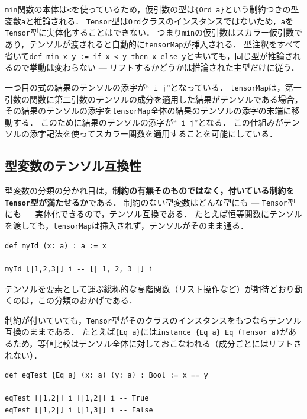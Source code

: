 \lstinline{min}関数の本体は\lstinline{<}を使っているため，仮引数の型は\lstinline|{Ord a}|という制約つきの型変数\lstinline{a}と推論される．
\lstinline{Tensor}型は\lstinline{Ord}クラスのインスタンスではないため，\lstinline{a}を\lstinline{Tensor}型に実体化することはできない．
つまり\lstinline{min}の仮引数はスカラー仮引数であり，テンソルが渡されると自動的に\lstinline{tensorMap}が挿入される．
型注釈をすべて省いて\lstinline{def min x y := if x < y then x else y}と書いても，同じ型が推論されるので挙動は変わらない --- リフトするかどうかは推論された主型だけに従う．

一つ目の式の結果のテンソルの添字が``\lstinline|_i_j|''となっている．
\lstinline{tensorMap}は，第一引数の関数に第二引数のテンソルの成分を適用した結果がテンソルである場合，その結果のテンソルの添字を\lstinline{tensorMap}全体の結果のテンソルの添字の末端に移動する．
このために結果のテンソルの添字が``\lstinline|_i_j|''となる．
この仕組みがテンソルの添字記法を使ってスカラー関数を適用することを可能にしている．

\subsection{型変数のテンソル互換性}

型変数の分類の分かれ目は，\textbf{制約の有無そのものではなく，付いている制約を\lstinline{Tensor}型が満たせるか}である．
制約のない型変数はどんな型にも --- \lstinline{Tensor}型にも --- 実体化できるので，テンソル互換である．
たとえば恒等関数にテンソルを渡しても，\lstinline{tensorMap}は挿入されず，テンソルがそのまま通る．
\begin{lstlisting}[language=egison,numbers=none]
def myId (x: a) : a := x

myId [|1,2,3|]_i -- [| 1, 2, 3 |]_i
\end{lstlisting}
テンソルを要素として運ぶ総称的な高階関数（リスト操作など）が期待どおり動くのは，この分類のおかげである．

制約が付いていても，\lstinline{Tensor}型がそのクラスのインスタンスをもつならテンソル互換のままである．
たとえば\lstinline|{Eq a}|には\lstinline|instance {Eq a} Eq (Tensor a)|があるため，等値比較はテンソル全体に対しておこなわれる（成分ごとにはリフトされない）．
\begin{lstlisting}[language=egison,numbers=none]
def eqTest {Eq a} (x: a) (y: a) : Bool := x == y

eqTest [|1,2|]_i [|1,2|]_i -- True
eqTest [|1,2|]_i [|1,3|]_i -- False
\end{lstlisting}

